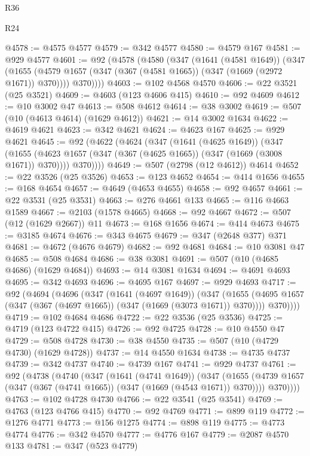 \begin{lexlean}{R36}
\begin{lexlean}{R24}
\begin{coremodule}
{{{{{{{{{{{{{{{{{{{{{{{{{{{{{{{{{{{{{{{{{{{{{{{{{{{{{{{{{{{{{{{{{{{{{{{{{{{{{{{{{{{{{{{{{{{{{{{{{{{{{{{{{{{{{{{{{{{{{{{{{{{{{{{{{{{{{{{{{{{{{{{{{{{{{{{{{{{{{{{{{{{{{{{{{{{{{{{{{{{{{{{{{{{{{{{{{{{@4578 := @4575 @4577
@4579 := @342 @4577
@4580 := @4579 @167
@4581 := @929 @4577
@4601 := @92
    (@4578
      (@4580
        (@347
          (@1641 (@4581 @1649))
          (@347
            (@1655 (@4579 @1657 (@347 (@367 (@4581 @1665)) (@347 (@1669 (@2972 @1671)) @370))))
            @370))))
@4603 := @102 @4568 @4570
@4606 := @22 @3521 (@25 @3521)
@4609 := @4603 (@123 @4606 @415)
@4610 := @92 @4609
@4612 := @10 @3002 @47
@4613 := @508 @4612
@4614 := @38 @3002
@4619 := @507 (@10 (@4613 @4614) (@1629 @4612))
@4621 := @14 @3002 @1634
@4622 := @4619 @4621
@4623 := @342 @4621
@4624 := @4623 @167
@4625 := @929 @4621
@4645 := @92
    (@4622
      (@4624
        (@347
          (@1641 (@4625 @1649))
          (@347
            (@1655 (@4623 @1657 (@347 (@367 (@4625 @1665)) (@347 (@1669 (@3008 @1671)) @370))))
            @370))))
@4649 := @507 (@2798 (@12 @4612)) @4614
@4652 := @22 @3526 (@25 @3526)
@4653 := @123 @4652
@4654 := @414 @1656
@4655 := @168 @4654
@4657 := @4649 (@4653 @4655)
@4658 := @92 @4657
@4661 := @22 @3531 (@25 @3531)
@4663 := @276 @4661 @133
@4665 := @116 @4663 @1589
@4667 := @2103 (@1578 @4665)
@4668 := @92 @4667
@4672 := @507 (@12 (@1629 @2667)) @11
@4673 := @168 @1656
@4674 := @414 @4673
@4675 := @3185 @4674
@4676 := @343 @4675
@4679 := @347 (@2648 @377) @371
@4681 := @4672 (@4676 @4679)
@4682 := @92 @4681
@4684 := @10 @3081 @47
@4685 := @508 @4684
@4686 := @38 @3081
@4691 := @507 (@10 (@4685 @4686) (@1629 @4684))
@4693 := @14 @3081 @1634
@4694 := @4691 @4693
@4695 := @342 @4693
@4696 := @4695 @167
@4697 := @929 @4693
@4717 := @92
    (@4694
      (@4696
        (@347
          (@1641 (@4697 @1649))
          (@347
            (@1655 (@4695 @1657 (@347 (@367 (@4697 @1665)) (@347 (@1669 (@3073 @1671)) @370))))
            @370))))
@4719 := @102 @4684 @4686
@4722 := @22 @3536 (@25 @3536)
@4725 := @4719 (@123 @4722 @415)
@4726 := @92 @4725
@4728 := @10 @4550 @47
@4729 := @508 @4728
@4730 := @38 @4550
@4735 := @507 (@10 (@4729 @4730) (@1629 @4728))
@4737 := @14 @4550 @1634
@4738 := @4735 @4737
@4739 := @342 @4737
@4740 := @4739 @167
@4741 := @929 @4737
@4761 := @92
    (@4738
      (@4740
        (@347
          (@1641 (@4741 @1649))
          (@347
            (@1655 (@4739 @1657 (@347 (@367 (@4741 @1665)) (@347 (@1669 (@4543 @1671)) @370))))
            @370))))
@4763 := @102 @4728 @4730
@4766 := @22 @3541 (@25 @3541)
@4769 := @4763 (@123 @4766 @415)
@4770 := @92 @4769
@4771 := @899 @119
@4772 := @1276 @4771
@4773 := @156 @1275
@4774 := @898 @119
@4775 := @4773 @4774
@4776 := @342 @4570
@4777 := @4776 @167
@4779 := @2087 @4570 @133
@4781 := @347 (@523 @4779)
}}}}}}}}}}}}}}}}}}}}}}}}}}}}}}}}}}}}}}}}}}}}}}}}}}}}}}}}}}}}}}}}}}}}}}}}}}}}}}}}}}}}}}}}}}}}}}}}}}}}}}}}}}}}}}}}}}}}}}}}}}}}}}}}}}}}}}}}}}}}}}}}}}}}}}}}}}}}}}}}}}}}}}}}}}}}}}}}}}}}}}}}}}}}}}}}}}}
\end{coremodule}
\end{lexlean}
\end{lexlean}
